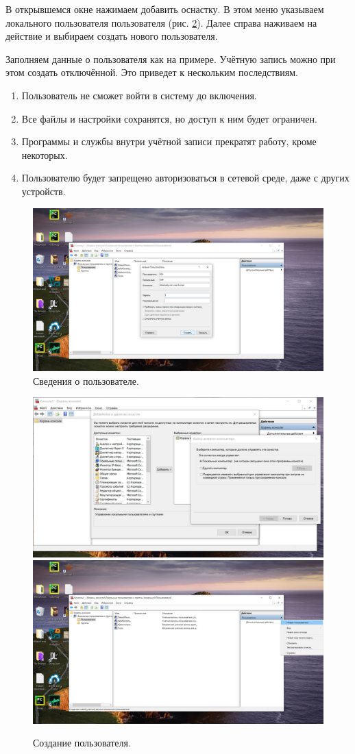 В открывшемся окне нажимаем добавить оснастку. В этом меню указываем локального пользователя пользователя (рис. \ref{fig:UserCreat}). Далее справа наживаем на действие и выбираем создать нового пользователя.

Заполняем данные о пользователя как на примере. Учётную запись можно при этом создать отключённой. Это приведет к нескольким последствиям.
\begin{enumerate}
    \item Пользователь не сможет войти в систему до включения.
    \item Все файлы и настройки сохранятся, но доступ к ним будет ограничен.
    \item Программы и службы внутри учётной записи прекратят работу, кроме некоторых.
    \item Пользователю будет запрещено авторизоваться в сетевой среде, даже с других устройств.
\end{enumerate}
\begin{figure}
    \centering
    \includegraphics[width=0.5\linewidth]{Pic/lab1/photo_2025-05-21_08-15-22.jpg}
    \caption{Сведения о пользователе.}
    \label{fig:enter-label}
\end{figure}

\begin{figure}
    \centering
    \includegraphics[width=0.5\linewidth]{Pic/lab1/photo_2025-05-21_08-15-19.jpg}
    \includegraphics[width=0.5\linewidth]{Pic/lab1/photo_2025-05-21_08-15-20.jpg}
    \caption{Создание пользователя.}
    \label{fig:UserCreat}
\end{figure}

